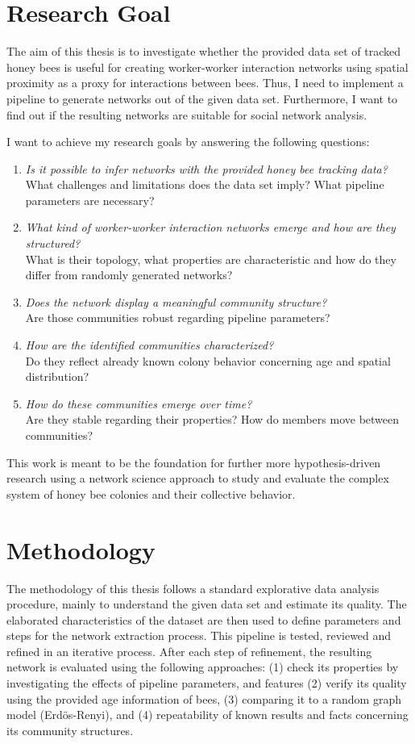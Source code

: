 \section{Research Goal}

The aim of this thesis is to investigate whether the provided data set of tracked honey bees is useful for creating worker-worker interaction networks using spatial proximity as a proxy for interactions between bees. Thus, I need to implement a pipeline to generate networks out of the given data set. Furthermore, I want to find out if the resulting networks are suitable for social network analysis.

I want to achieve my research goals by answering the following questions:

\begin{enumerate}
\item \emph{Is it possible to infer networks with the provided honey bee tracking data?}\\
What challenges and limitations does the data set imply? What pipeline parameters are necessary?
\item \emph{What kind of worker-worker interaction networks emerge and how are they structured?}\\
What is their topology, what properties are characteristic and how do they differ from randomly generated networks?
\item \emph{Does the network display a meaningful community structure?}\\
Are those communities robust regarding pipeline parameters?
\item \emph{How are the identified communities characterized?}\\
Do they reflect already known colony behavior concerning age and spatial distribution?
\item \emph{How do these communities emerge over time?}\\
Are they stable regarding their properties? How do members move between communities?
\end{enumerate}

This work is meant to be the foundation for further more hypothesis-driven research using a network science approach to study and evaluate the complex system of honey bee colonies and their collective behavior.

\section{Methodology}
The methodology of this thesis follows a standard explorative data analysis procedure, mainly to understand the given data set and estimate its quality. The elaborated characteristics of the dataset are then used to define parameters and steps for the network extraction process. This pipeline is tested, reviewed and refined in an iterative process.
After each step of refinement, the resulting network is evaluated using the following approaches: (1) check its properties by investigating the effects of pipeline parameters, and features (2) verify its quality using the provided age information of bees, (3) comparing it to a random graph model (Erdös-Renyi), and (4) repeatability of known results and facts concerning its community structures.

